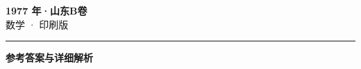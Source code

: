 \documentclass[zihao=5, a4paper]{ctexart}
\begin{document}
\begin{center}
  {\Large\bfseries 1977 年·山东B卷}\\[4pt]
  {\large 数学 · 印刷版}
\end{center}
\medskip
{}

\par\bigskip\hrule\bigskip
{}
\begin{center}{\large\bfseries 参考答案与详细解析}\end{center}
\smallskip

\end{document}
